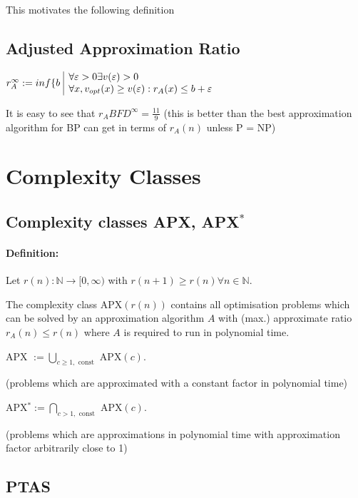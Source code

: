 \documentclass[11pt]{article}
\theoremstyle{definition}
\theoremstyle{definition}
\begin{document}

This motivates the following definition

\subsection{Adjusted Approximation Ratio}

$ r_A^\infty := inf \{ b ~ \begin{array}{| l} \forall \varepsilon > 0 \exists v(\varepsilon) > 0 \\ \forall x, v_{opt}(x) \geq v(\varepsilon) : r_A (x) \leq b + \varepsilon \end{array} $

It is easy to see that $ r_A{BFD}^\infty = \frac{11}{9} $ (this is better than the best approximation algorithm for BP can get in terms of $ r_A(n) $ unless P = NP)

\section{Complexity Classes}
\subsection{Complexity classes APX, APX$^\ast$}

\paragraph{Definition:} Let $ r(n) : \mathbb{N} \rightarrow [0, \infty) $ with $ r(n + 1) \geq r(n) \forall n \in \mathbb{N} $. \newline

The complexity class APX$(r(n)) $ contains all optimisation problems which can be solved by an approximation algorithm $ A $ with (max.) approximate ratio $ r_A(n) \leq r(n) $ where $ A $ is required to run in polynomial time. \medskip

APX $ := \bigcup \limits_{c \geq 1, \text{ const}} $ APX$(c) $.

(problems which are approximated with a constant factor in polynomial time) \medskip

APX$^\ast := \bigcap \limits_{c > 1, \text{ const}} $ APX$(c) $.

(problems which are approximations in polynomial time with approximation factor arbitrarily close to 1)

\subsection{PTAS}
\end{document}
